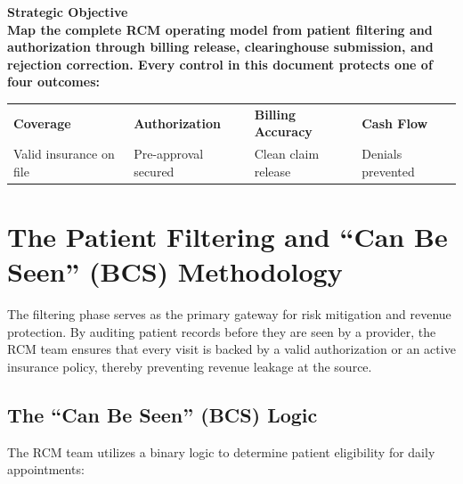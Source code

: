 \documentclass[11pt,a4paper]{article}
\begin{document}
\begin{tcolorbox}[statbox]
\begin{center}
  \Large\bfseries\color{PrimaryBlue}Strategic Objective\\[0.4em]
  \normalsize
  Map the complete RCM operating model from patient filtering and authorization
  through billing release, clearinghouse submission, and rejection correction.
  Every control in this document protects one of four outcomes:
\end{center}
\vspace{0.3em}
\begin{center}
\begin{tabularx}{0.96\linewidth}{C{3.1cm} C{3.1cm} C{3.1cm} C{3.1cm}}
  \textcolor{PrimaryBlue}{\bfseries Coverage} &
  \textcolor{AccentTeal}{\bfseries Authorization} &
  \textcolor{AccentGold}{\bfseries Billing Accuracy} &
  \textcolor{DangerRed}{\bfseries Cash Flow} \\
  Valid insurance on file &
  Pre-approval secured &
  Clean claim release &
  Denials prevented \\
\end{tabularx}
\end{center}
\end{tcolorbox}


\section{The Patient Filtering and ``Can Be Seen'' (BCS) Methodology}

The filtering phase serves as the primary gateway for risk mitigation and revenue protection. By auditing patient records before they are seen by a provider, the RCM team ensures that every visit is backed by a valid authorization or an active insurance policy, thereby preventing revenue leakage at the source.

\subsection{The ``Can Be Seen'' (BCS) Logic}

The RCM team utilizes a binary logic to determine patient eligibility for daily appointments:
\end{document}
